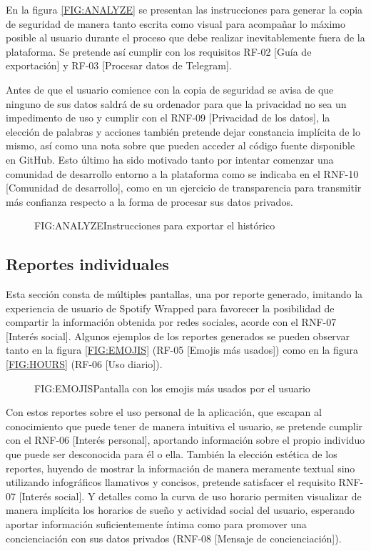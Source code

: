 En la figura \ref{FIG:ANALYZE} se presentan las instrucciones para generar la copia de seguridad de manera tanto escrita como visual para acompañar lo máximo posible al usuario durante el proceso que debe realizar inevitablemente fuera de la plataforma. Se pretende así cumplir con los requisitos RF-02 [Guía de exportación] y RF-03 [Procesar datos de Telegram].

Antes de que el usuario comience con la copia de seguridad se avisa de que ninguno de sus datos saldrá de su ordenador para que la privacidad no sea un impedimento de uso y cumplir con el RNF-09 [Privacidad de los datos], la elección de palabras y acciones también pretende dejar constancia implícita de lo mismo, así como una nota sobre que pueden acceder al código fuente disponible en GitHub. Esto último ha sido motivado tanto por intentar comenzar una comunidad de desarrollo entorno a la plataforma como se indicaba en el RNF-10 [Comunidad de desarrollo], como en un ejercicio de transparencia para transmitir más confianza respecto a la forma de procesar sus datos privados.

\begin{figure}[]{FIG:ANALYZE}{Instrucciones para exportar el histórico}
\end{figure}

\subsection{Reportes individuales}

Esta sección consta de múltiples pantallas, una por reporte generado, imitando la experiencia de usuario de Spotify Wrapped para favorecer la posibilidad de compartir la información obtenida por redes sociales, acorde con el RNF-07 [Interés social]. Algunos ejemplos de los reportes generados se pueden observar tanto en la figura \ref{FIG:EMOJIS} (RF-05 [Emojis más usados]) como en la figura \ref{FIG:HOURS} (RF-06 [Uso diario]).

\begin{figure}[]{FIG:EMOJIS}{Pantalla con los emojis más usados por el usuario}
\end{figure}

Con estos reportes sobre el uso personal de la aplicación, que escapan al conocimiento que puede tener de manera intuitiva el usuario, se pretende cumplir con el RNF-06 [Interés personal], aportando información sobre el propio individuo que puede ser desconocida para él o ella. También la elección estética de los reportes, huyendo de mostrar la información de manera meramente textual sino utilizando infográficos llamativos y concisos, pretende satisfacer el requisito RNF-07 [Interés social]. Y detalles como la curva de uso horario permiten visualizar de manera implícita los horarios de sueño y actividad social del usuario, esperando aportar información suficientemente íntima como para promover una concienciación con sus datos privados (RNF-08 [Mensaje de concienciación]).

